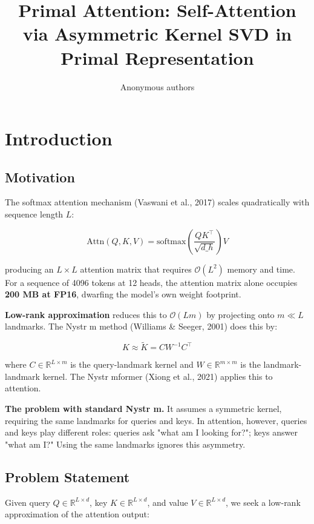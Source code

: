 \title{\textbf{Primal Attention: Self-Attention via Asymmetric Kernel SVD in Primal Representation}}

\author{Anonymous authors}



\section{Introduction}

\subsection{Motivation}

The softmax attention mechanism (Vaswani et al., 2017) scales quadratically 
with sequence length $L$:

\[
\text{Attn}(Q, K, V) = \text{softmax}\!\left(\frac{Q K^\top}{\sqrt{d\_h}}\right) V
\]

producing an $L \times L$ attention matrix that requires $\mathcal{O}(L^2)$ 
memory and time. For a sequence of 4096 tokens at 12 heads, the attention 
matrix alone occupies \textbf{200 MB at FP16}, dwarfing the model's own weight 
footprint.

\textbf{Low-rank approximation} reduces this to $\mathcal{O}(L m)$ by projecting 
onto $m \ll L$ landmarks. The Nystr m method (Williams \& Seeger, 2001) does 
this by:

\[
K \approx \tilde{K} = C W^{-1} C^\top
\]

where $C \in \mathbb{R}^{L \times m}$ is the query-landmark kernel and 
$W \in \mathbb{R}^{m \times m}$ is the landmark-landmark kernel. The 
Nystr mformer (Xiong et al., 2021) applies this to attention.

\textbf{The problem with standard Nystr m.} It assumes a symmetric kernel, 
requiring the same landmarks for queries and keys. In attention, however, 
queries and keys play different roles: queries ask "what am I looking for?"; 
keys answer "what am I?" Using the same landmarks ignores this asymmetry.

\subsection{Problem Statement}

Given query $Q \in \mathbb{R}^{L \times d}$, key $K \in \mathbb{R}^{L \times d}$, 
and value $V \in \mathbb{R}^{L \times d}$, we seek a low-rank approximation 
of the attention output:

